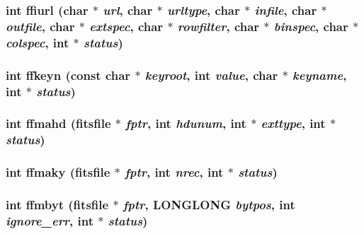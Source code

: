 \subsubsection{\setlength{\rightskip}{0pt plus 5cm}int ffiurl (char $\ast$ {\em url}, char $\ast$ {\em urltype}, char $\ast$ {\em infile}, char $\ast$ {\em outfile}, char $\ast$ {\em extspec}, char $\ast$ {\em rowfilter}, char $\ast$ {\em binspec}, char $\ast$ {\em colspec}, int $\ast$ {\em status})}\label{src_2fitsio_8h_841d8003c651737bdaaf3df7507a3691}


\subsubsection{\setlength{\rightskip}{0pt plus 5cm}int ffkeyn (const char $\ast$ {\em keyroot}, int {\em value}, char $\ast$ {\em keyname}, int $\ast$ {\em status})}\label{src_2fitsio_8h_8439e81e5e5ec5d57530c44db55ff774}


\subsubsection{\setlength{\rightskip}{0pt plus 5cm}int ffmahd (\bf{fitsfile} $\ast$ {\em fptr}, int {\em hdunum}, int $\ast$ {\em exttype}, int $\ast$ {\em status})}\label{src_2fitsio_8h_bf55072a6e71f57598a83d1b89d9ac4d}


\subsubsection{\setlength{\rightskip}{0pt plus 5cm}int ffmaky (\bf{fitsfile} $\ast$ {\em fptr}, int {\em nrec}, int $\ast$ {\em status})}\label{src_2fitsio_8h_7a704bb29df41ba2926bf18398ac67bf}


\subsubsection{\setlength{\rightskip}{0pt plus 5cm}int ffmbyt (\bf{fitsfile} $\ast$ {\em fptr}, \bf{LONGLONG} {\em bytpos}, int {\em ignore\_\-err}, int $\ast$ {\em status})}\label{src_2fitsio_8h_d46d8495fae664fff9a6e7307bec570f}


